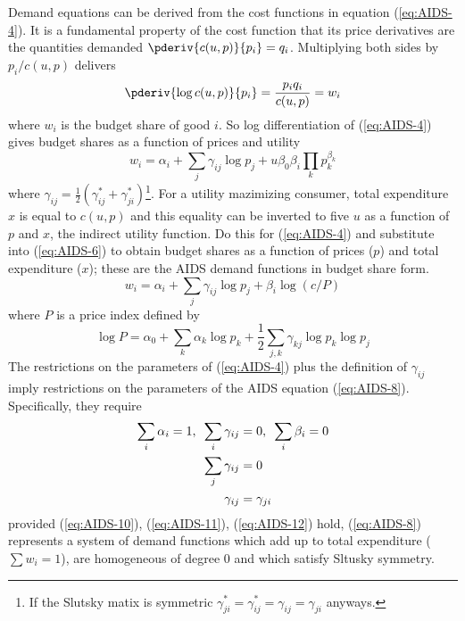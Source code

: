  Demand equations can be derived from the cost functions in equation (\ref{eq:AIDS-4}). It is a fundamental property of the cost function that its price derivatives are the quantities demanded $\pderiv{c(u,p)}{p_i} = q_i$. Multiplying both sides by $p_i/c(u,p)$ delivers 
 \begin{equation}
 	\label{eq:AIDS-5}
 	\pderiv{\log c(u,p)}{p_i} = \frac{p_i q_i}{c(u,p)} = w_i
 \end{equation}
 where $w_i$ is the budget share of good $i$. So log differentiation of (\ref{eq:AIDS-4}) gives budget shares as a function of prices and utility 
 \begin{equation}
 	\label{eq:AIDS-6}
 	w_i = \alpha_i + \sum_j \gamma_{ij} \log p_j + u \beta_0\beta_i \prod_k p_k^{\beta_k}
 \end{equation}
 where $\gamma_{ij} = \frac{1}{2}(\gamma^*_{ij} + \gamma^*_{ji})$\footnote{If the Slutsky matix is symmetric $\gamma_{ji}^* = \gamma_{ij}^* = \gamma_{ij}= \gamma_{ji}$ anyways.}. For a utility mazimizing consumer, total expenditure $x$ is equal to $c(u,p)$ and this equality can be inverted to five $u$ as a function of $p$ and $x$, the indirect utility function. Do this for (\ref{eq:AIDS-4}) and substitute into (\ref{eq:AIDS-6}) to obtain budget shares as a function of prices (\(p\)) and total expenditure (\(x\)); these are the AIDS demand functions in budget share form. 
 \begin{equation}
 	\label{eq:AIDS-8}
 	w_i = \alpha_i + \sum_j \gamma_{ij}\log p_j + \beta_i \log (c/P)
 \end{equation}
 where $P$ is a price index defined by 
 \begin{equation}
 	\label{eq:AIDS-9}
 	\log P = \alpha_0 + \sum_k \alpha_k \log p_k + \frac{1}{2} \sum_{j,k} \gamma_{kj} \log p_k \log p_j
 \end{equation}
 The restrictions on the parameters of (\ref{eq:AIDS-4}) plus the definition of $\gamma_{ij}$ imply restrictions on the parameters of the AIDS equation (\ref{eq:AIDS-8}). Specifically, they require
 \begin{align}
     \label{eq:AIDS-10}
     \sum_i \alpha_i = 1,\hbox{ }  \sum_i \gamma_{ij} &= 0 ,\hbox{ } \sum_i \beta_i = 0 \\
     \label{eq:AIDS-11}
     \sum_j \gamma_{ij} &= 0 \\
     \label{eq:AIDS-12}
     \gamma_{ij} &= \gamma_{ji}
 \end{align}
 provided (\ref{eq:AIDS-10}), (\ref{eq:AIDS-11}), (\ref{eq:AIDS-12}) hold, (\ref{eq:AIDS-8}) represents a system of demand functions which add up to total expenditure (\(\sum w_i = 1\)), are homogeneous of degree 0 and which satisfy Sltusky symmetry.

